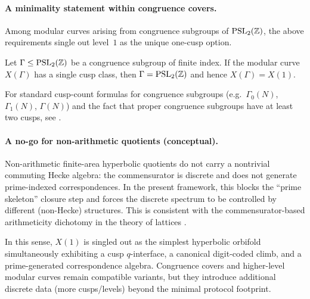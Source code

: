 \paragraph{A minimality statement within congruence covers.}
Among modular curves arising from congruence subgroups of $\mathrm{PSL}_2(\mathbb{Z})$, the above requirements single out level~$1$ as the unique one-cusp option.
\begin{proposition}
\label{prop:one_cusp_congruence_minimality}
Let $\Gamma\le \mathrm{PSL}_2(\mathbb{Z})$ be a congruence subgroup of finite index. If the modular curve $X(\Gamma)$ has a single cusp class, then $\Gamma=\mathrm{PSL}_2(\mathbb{Z})$ and hence $X(\Gamma)=X(1)$.
\end{proposition}
\begin{remark}
For standard cusp-count formulas for congruence subgroups (e.g.\ $\Gamma_0(N)$, $\Gamma_1(N)$, $\Gamma(N)$) and the fact that proper congruence subgroups have at least two cusps, see \cite{DiamondShurman2005,Apostol1990}.
\end{remark}

\paragraph{A no-go for non-arithmetic quotients (conceptual).}
Non-arithmetic finite-area hyperbolic quotients do not carry a nontrivial commuting Hecke algebra: the commensurator is discrete and does not generate prime-indexed correspondences.
In the present framework, this blocks the ``prime skeleton'' closure step and forces the discrete spectrum to be controlled by different (non-Hecke) structures.
This is consistent with the commensurator-based arithmeticity dichotomy in the theory of lattices \cite{Margulis1991}.
\par
In this sense, $X(1)$ is singled out as the simplest hyperbolic orbifold simultaneously exhibiting a cusp $q$-interface, a canonical digit-coded climb, and a prime-generated correspondence algebra.
Congruence covers and higher-level modular curves remain compatible variants, but they introduce additional discrete data (more cusps/levels) beyond the minimal protocol footprint.

